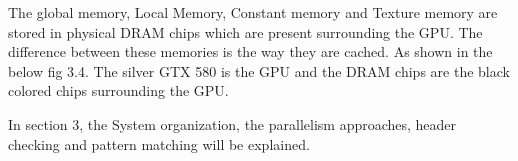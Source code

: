 The global memory, Local Memory, Constant memory and Texture memory are stored in physical DRAM chips which are present surrounding the GPU. The difference between these memories is the way they are cached. As shown in the below fig 3.4. The silver GTX 580 is the GPU and the DRAM chips are the black colored chips surrounding the GPU.


In section 3, the System organization, the parallelism approaches, header checking and pattern matching will be explained.